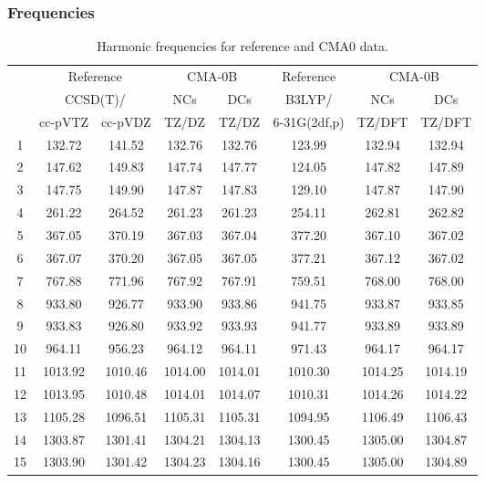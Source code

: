 \documentclass[10pt,oneside]{article}
\begin{document}
\clearpage

\subsubsection*{Frequencies}
\begin{table}[h!]
\centering
\caption{Harmonic frequencies for reference and CMA0 data.}
\begin{tabular}{cccccccc}
\toprule
{} & \multicolumn{2}{c}{Reference} & \multicolumn{2}{c}{CMA-0B} &    Reference & \multicolumn{2}{c}{CMA-0B} \\
{} & \multicolumn{2}{c}{CCSD(T)/} &     NCs &     DCs &       B3LYP/ &     NCs &     DCs \\
{} &   cc-pVTZ & cc-pVDZ &   TZ/DZ &   TZ/DZ & 6-31G(2df,p) &  TZ/DFT &  TZ/DFT \\
\midrule
1  &    132.72 &  141.52 &  132.76 &  132.76 &       123.99 &  132.94 &  132.94 \\
2  &    147.62 &  149.83 &  147.74 &  147.77 &       124.05 &  147.82 &  147.89 \\
3  &    147.75 &  149.90 &  147.87 &  147.83 &       129.10 &  147.87 &  147.90 \\
4  &    261.22 &  264.52 &  261.23 &  261.23 &       254.11 &  262.81 &  262.82 \\
5  &    367.05 &  370.19 &  367.03 &  367.04 &       377.20 &  367.10 &  367.02 \\
6  &    367.07 &  370.20 &  367.05 &  367.05 &       377.21 &  367.12 &  367.02 \\
7  &    767.88 &  771.96 &  767.92 &  767.91 &       759.51 &  768.00 &  768.00 \\
8  &    933.80 &  926.77 &  933.90 &  933.86 &       941.75 &  933.87 &  933.85 \\
9  &    933.83 &  926.80 &  933.92 &  933.93 &       941.77 &  933.89 &  933.89 \\
10 &    964.11 &  956.23 &  964.12 &  964.11 &       971.43 &  964.17 &  964.17 \\
11 &   1013.92 & 1010.46 & 1014.00 & 1014.01 &      1010.30 & 1014.25 & 1014.19 \\
12 &   1013.95 & 1010.48 & 1014.01 & 1014.07 &      1010.31 & 1014.26 & 1014.22 \\
13 &   1105.28 & 1096.51 & 1105.31 & 1105.31 &      1094.95 & 1106.49 & 1106.43 \\
14 &   1303.87 & 1301.41 & 1304.21 & 1304.13 &      1300.45 & 1305.00 & 1304.87 \\
15 &   1303.90 & 1301.42 & 1304.23 & 1304.16 &      1300.45 & 1305.00 & 1304.89 \\

\end{tabular}
\end{table}
\end{document}
